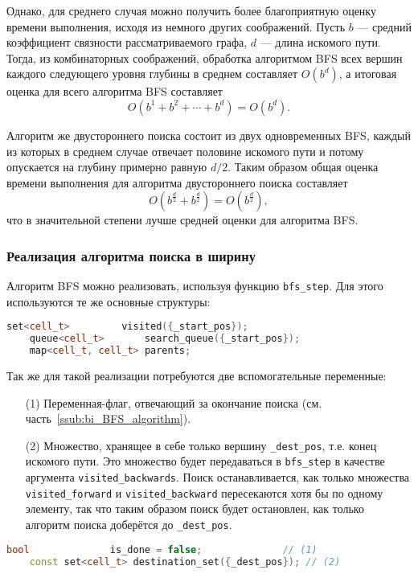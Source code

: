 \documentclass[a4paper, 12pt]{article}
\begin{document}
Однако, для среднего случая можно получить более благоприятную оценку времени выполнения, исходя из немного других соображений. Пусть \({ b }\) --- средний коэффициент связности рассматриваемого графа, \({ d }\) --- длина искомого пути. Тогда, из комбинаторных соображений, обработка алгоритмом BFS всех вершин каждого следующего уровня глубины в среднем составляет \({ O(b^d) }\), а итоговая оценка для всего алгоритма BFS составляет
\[
    O(b^1 + b^2 + \cdots + b^d) = O(b^d).
\]

Алгоритм же двустороннего поиска состоит из двух одновременных BFS, каждый из которых в среднем случае отвечает половине искомого пути и потому опускается на глубину примерно равную \({ d/2 }\). Таким образом общая оценка времени выполнения для алгоритма двустороннего поиска составляет
\[
    O(b^{\frac{d}{2}} + b^{\frac{d}{2}}) = O(b^{\frac{d}{2}}),
\]
что в значительной степени лучше средней оценки для алгоритма BFS.

\subsubsection{Реализация алгоритма поиска в ширину}
\label{ssub:BFS_implementation}
Алгоритм BFS можно реализовать, используя функцию \verb|bfs_step|. Для этого используются те же основные структуры:
\begin{lstlisting}[language=C++]
    set<cell_t>         visited({_start_pos});
    queue<cell_t>       search_queue({_start_pos});
    map<cell_t, cell_t> parents;
\end{lstlisting}

Так же для такой реализации потребуются две вспомогательные переменные:
\begin{itemize}
    \item[(1)] Переменная-флаг, отвечающий за окончание поиска (см. часть~\ref{ssub:bi_BFS_algorithm}).
    \item[(2)] Множество, хранящее в себе только вершину \verb|_dest_pos|, т.е. конец искомого пути. Это множество будет передаваться в \verb|bfs_step| в качестве аргумента \verb|visited_backwards|. Поиск останавливается, как только множества \verb|visited_forward| и \verb|visited_backward| пересекаются хотя бы по одному элементу,  так что таким образом поиск будет остановлен, как только алгоритм поиска доберётся до \verb|_dest_pos|.
\end{itemize}
\begin{lstlisting}[language=C++]
    bool              is_done = false;              // (1)
    const set<cell_t> destination_set({_dest_pos}); // (2)
\end{lstlisting}
\end{document}
